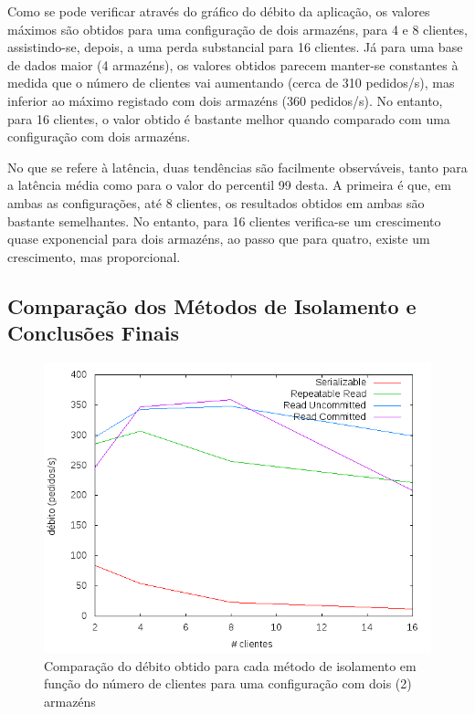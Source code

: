 Como se pode verificar através do gráfico do débito da aplicação, os valores máximos são obtidos para uma configuração de dois armazéns, para 4 e 8 clientes, assistindo-se, depois, a uma perda substancial para 16 clientes.
Já para uma base de dados maior (4 armazéns), os valores obtidos parecem manter-se constantes à medida que o número de clientes vai aumentando (cerca de 310 pedidos/s), mas inferior ao máximo registado com dois armazéns (360 pedidos/s).
No entanto, para 16 clientes, o valor obtido é bastante melhor quando comparado com uma configuração com dois armazéns.

No que se refere à latência, duas tendências são facilmente observáveis, tanto para a latência média como para o valor do percentil 99 desta.
A primeira é que, em ambas as configurações, até 8 clientes, os resultados obtidos em ambas são bastante semelhantes.
No entanto, para 16 clientes verifica-se um crescimento quase exponencial para dois armazéns, ao passo que para quatro, existe um crescimento, mas proporcional.

\newpage

\subsection{Comparação dos Métodos de Isolamento e Conclusões Finais}

\begin{figure}[!h]
\centering
\includegraphics[scale=.5]{img/questao-1/diff-deb-2-arm}
\caption{Comparação do débito obtido para cada método de isolamento em função do número de clientes para uma configuração com dois (2) armazéns}
\end{figure}

